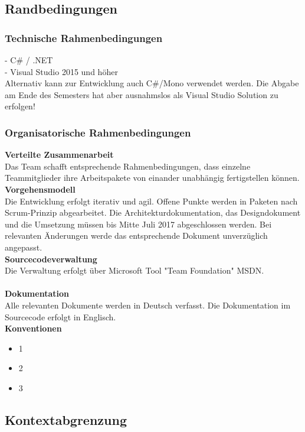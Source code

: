 \documentclass[12pt,a4paper,bibliography=totocnumbered,listof=totocnumbered]{scrartcl}
\begin{document}
\subsection{Randbedingungen}
\subsubsection{Technische Rahmenbedingungen}
- C\# / .NET\\
- Visual Studio 2015 und höher \\
Alternativ kann zur Entwicklung auch C\#/Mono verwendet werden. Die Abgabe am Ende des Semesters hat aber ausnahmslos als Visual Studio Solution zu erfolgen!\\

\subsubsection{Organisatorische Rahmenbedingungen}
\textbf{Verteilte Zusammenarbeit} \\
Das Team schafft entsprechende Rahmenbedingungen, dass einzelne Teammitglieder ihre Arbeitspakete von einander unabhängig fertigstellen können.
\\
\textbf{Vorgehensmodell }\\
Die Entwicklung erfolgt iterativ und agil. Offene Punkte werden in Paketen nach Scrum-Prinzip abgearbeitet. Die Architekturdokumentation, das Designdokument und die Umsetzung müssen bis Mitte Juli 2017 abgeschlossen werden.
Bei relevanten Änderungen werde das entsprechende Dokument unverzüglich angepasst.
\\
\textbf{Sourcecodeverwaltung} \\
 Die Verwaltung erfolgt über Microsoft Tool "Team Foundation" MSDN. \\
\\
\textbf{Dokumentation} \\
 Alle relevanten Dokumente werden in Deutsch verfasst. Die Dokumentation im Sourcecode erfolgt in Englisch.
\\
\textbf{Konventionen} \\
\begin{itemize}
\item 1
\item 2
\item 3
\end{itemize}



\subsection{Kontextabgrenzung}
\end{document}
